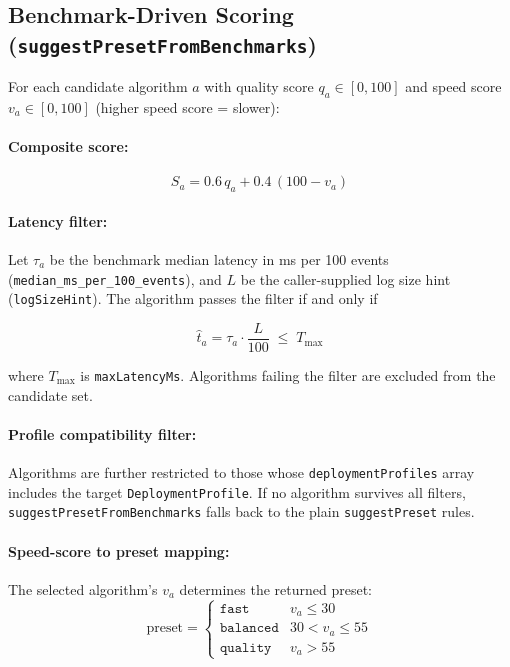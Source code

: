 \documentclass[11pt,a4paper]{article}
\begin{document}
\subsection{Benchmark-Driven Scoring (\texttt{suggestPresetFromBenchmarks})}

For each candidate algorithm $a$ with quality score $q_a \in [0,100]$ and speed
score $v_a \in [0,100]$ (higher speed score = slower):

\paragraph{Composite score:}
\begin{equation}
  S_a = 0.6\,q_a + 0.4\,(100 - v_a)
\end{equation}

\paragraph{Latency filter:}
Let $\tau_a$ be the benchmark median latency in ms per 100 events
(\texttt{median\_ms\_per\_100\_events}), and $L$ be the caller-supplied log
size hint (\texttt{logSizeHint}). The algorithm passes the filter if and only if

\begin{equation}
  \hat{t}_a = \tau_a \cdot \frac{L}{100} \;\leq\; T_{\max}
\end{equation}

where $T_{\max}$ is \texttt{maxLatencyMs}. Algorithms failing the filter are
excluded from the candidate set.

\paragraph{Profile compatibility filter:}
Algorithms are further restricted to those whose \texttt{deploymentProfiles}
array includes the target \texttt{DeploymentProfile}. If no algorithm survives
all filters, \texttt{suggestPresetFromBenchmarks} falls back to the plain
\texttt{suggestPreset} rules.

\paragraph{Speed-score to preset mapping:}
The selected algorithm's $v_a$ determines the returned preset:
\begin{equation}
  \text{preset} =
  \begin{cases}
    \texttt{fast}     & v_a \leq 30 \\
    \texttt{balanced} & 30 < v_a \leq 55 \\
    \texttt{quality}  & v_a > 55
  \end{cases}
\end{equation}
\end{document}

